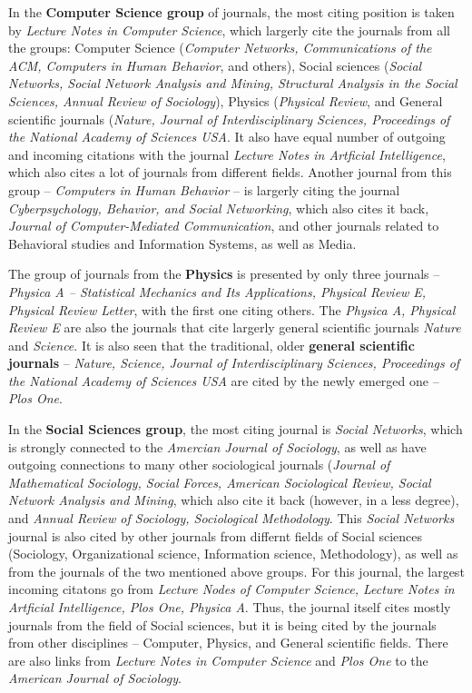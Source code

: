 \documentclass[11pt]{article} %
\begin{document}
In the \textbf{Computer Science group} of journals, the most citing position is taken by \textit{Lecture Notes in Computer Science}, which largerly cite the journals from all the groups: Computer Science (\textit{Computer Networks, Communications of the ACM, Computers in Human Behavior}, and others), Social sciences (\textit{Social Networks, Social Network Analysis and Mining, Structural Analysis in the Social Sciences, Annual Review of Sociology}), Physics (\textit{Physical Review}, and General scientific journals (\textit{Nature, Journal of Interdisciplinary Sciences, Proceedings of the National Academy of Sciences USA}. It also have equal number of outgoing and incoming citations with the journal \textit{Lecture Notes in Artficial Intelligence}, which also cites a lot of journals from different fields. Another journal from this group -- \textit{Computers in Human Behavior} -- is largerly citing the journal \textit{Cyberpsychology, Behavior, and Social Networking}, which also cites it back, \textit{Journal of Computer-Mediated Communication}, and other journals related to Behavioral studies and Information Systems, as well as Media. \medskip 

The group of journals from the \textbf{Physics} is presented by only three journals -- \textit{Physica A -- Statistical Mechanics and Its Applications, Physical Review E, Physical Review Letter}, with the first one citing others. The \textit{Physica A, Physical Review E} are also the journals that cite largerly general scientific journals \textit{Nature} and \textit{Science}. It is also seen that the traditional, older \textbf{general scientific journals} -- \textit{Nature, Science, Journal of Interdisciplinary Sciences, Proceedings of the National Academy of Sciences USA} are cited by the newly emerged one -- \textit{Plos One}. \medskip  

In the \textbf{Social Sciences group}, the most citing journal is \textit{Social Networks}, which is strongly connected to the \textit{Amercian Journal of Sociology}, as well as have outgoing connections to many other sociological journals (\textit{Journal of Mathematical Sociology, Social Forces, American Sociological Review, Social Network Analysis and Mining}, which also cite it back (however, in a less degree), and \textit{Annual Review of Sociology, Sociological Methodology}. This \textit{Social Networks} journal is also cited by other journals from differnt fields of Social sciences (Sociology, Organizational science, Information science, Methodology), as well as from the journals of the two mentioned above groups. For this journal, the largest incoming citatons go from \textit{Lecture Nodes of Computer Science,  Lecture Notes in Artficial Intelligence, Plos One, Physica A}. Thus, the journal itself cites mostly journals from the field of Social sciences, but it is being cited by the journals from other disciplines -- Computer, Physics, and General scientific fields. There are also links from \textit{Lecture Notes in Computer Science} and \textit{Plos One} to  the \textit{American Journal of Sociology}. \medskip  \medskip 
\end{document}

